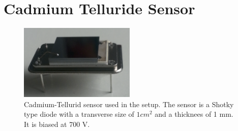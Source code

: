 %
%
%
\section{Cadmium Telluride Sensor}
\label{sec:siliconpad}


\begin{figure}[htbp] 
\centering
\includegraphics[width=0.49\textwidth]{figures/CdTeSensor.png} 
\caption{Cadmium-Tellurid sensor used in the setup. The sensor is a Shotky type diode with a transverse size of $1 cm^2$ and a thicknees of 1 mm. It is biased at 700 V.} 

\label{fig:CdTeSensor} 
\end{figure} 
